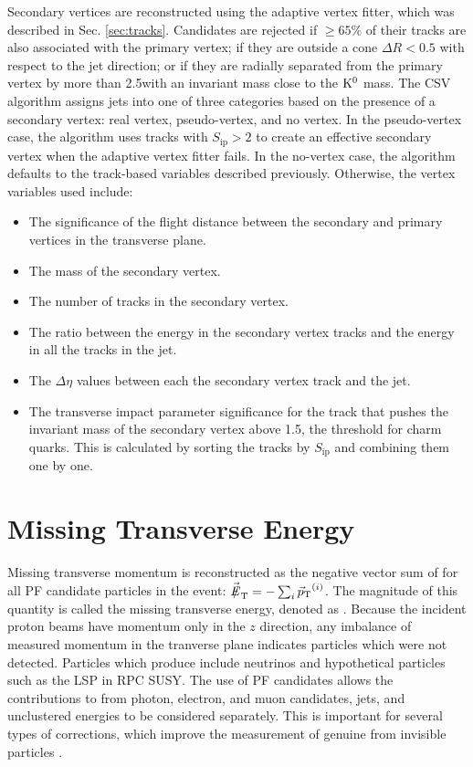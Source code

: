Secondary vertices are reconstructed using the adaptive vertex fitter, which was described in Sec. \ref{sec:tracks}. Candidates are rejected if ${\geq}65\%$ of their tracks are also associated with the primary vertex; if they are outside a cone $\Delta R < 0.5$ with respect to the jet direction; or if they are radially separated from the primary vertex by more than 2.5\cm with an invariant mass close to the $\mathrm{K}^{0}$ mass. The CSV algorithm assigns jets into one of three categories based on the presence of a secondary vertex: real vertex, pseudo-vertex, and no vertex. In the pseudo-vertex case, the algorithm uses tracks with $S_{\text{ip}} > 2$ to create an effective secondary vertex when the adaptive vertex fitter fails. In the no-vertex case, the algorithm defaults to the track-based variables described previously. Otherwise, the vertex variables used include:
\begin{itemize}
\item The significance of the flight distance between the secondary and primary vertices in the transverse plane.
\item The mass of the secondary vertex.
\item The number of tracks in the secondary vertex.
\item The ratio between the energy in the secondary vertex tracks and the energy in all the tracks in the jet.
\item The $\Delta\eta$ values between each the secondary vertex track and the jet.
\item The transverse impact parameter significance for the track that pushes the invariant mass of the secondary vertex above 1.5\GeVcc, the threshold for charm quarks. This is calculated by sorting the tracks by $S_{\text{ip}}$ and combining them one by one.
\end{itemize}

\section{Missing Transverse Energy
\label{sec:met}}

Missing transverse momentum is reconstructed as the negative vector sum of \vecpt for all PF candidate particles in the event: $\vecmet = - \sum_{i} \vecpt^{(i)}$. The magnitude of this quantity is called the missing transverse energy, denoted as \met. Because the incident proton beams have momentum only in the $z$ direction, any imbalance of measured momentum in the tranverse plane indicates particles which were not detected. Particles which produce \met include neutrinos and hypothetical particles such as the LSP in RPC SUSY. The use of PF candidates allows the contributions to \met from photon, electron, and muon candidates, jets, and unclustered energies to be considered separately. This is important for several types of corrections, which improve the measurement of genuine \met from invisible particles \cite{METperf2012}.

